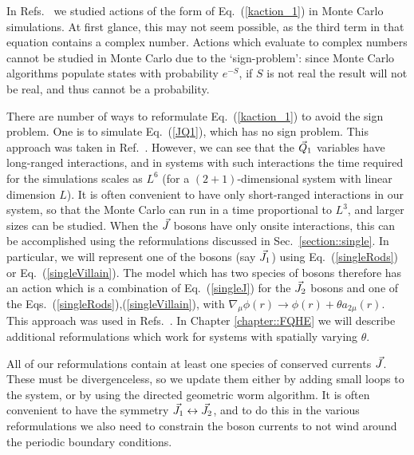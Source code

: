 In Refs.~\cite{Loopy,short_range3,Gen2Loops,FQHE} we studied actions of the form of Eq.~(\ref{kaction_1}) in Monte Carlo simulations. At first glance, this may not seem possible, as the third term in that equation contains a complex number. Actions which evaluate to complex numbers cannot be studied in Monte Carlo due to the `sign-problem': since Monte Carlo algorithms populate states with probability $e^{-S}$, if $S$ is not real the result will not be real, and thus cannot be a probability.

There are number of ways to reformulate Eq.~(\ref{kaction_1}) to avoid the sign problem. One is to simulate Eq.~(\ref{JQ1}), which has no sign problem. This approach was taken in Ref.~\cite{Gen2Loops}. However, we can see that the $\vec{Q}_1$ variables have long-ranged interactions, and in systems with such interactions the time required for the simulations scales as $L^6$ (for a $(2+1)$-dimensional system with linear dimension $L$). It is often convenient to have only short-ranged interactions in our system, so that the Monte Carlo can run in a time proportional to $L^3$, and larger sizes can be studied. 
When the $\vec{J}$ bosons have only onsite interactions, this can be accomplished using the reformulations discussed in Sec.~\ref{section::single}. In particular, we will represent one of the bosons (say $\vec{J}_1$) using Eq.~(\ref{singleRods}) or Eq.~(\ref{singleVillain}). The model which has two species of bosons therefore has an action which is a combination of Eq.~(\ref{singleJ}) for the $\vec{J}_2$ bosons and one of the Eqs.~(\ref{singleRods}),(\ref{singleVillain}), with $\nabla_\mu\phi(r)\rightarrow\phi(r)+\theta a_{2\mu}(r)$. This approach was used in Refs.~\cite{Loopy,short_range3}. 
In Chapter \ref{chapter::FQHE} we will describe additional reformulations which work for systems with spatially varying $\theta$. 

All of our reformulations contain at least one species of conserved currents $\vec{J}$. These must be divergenceless, so we update them either by adding small loops to the system, or by using the directed geometric worm algorithm\cite{Sorensen}. It is often convenient to have the symmetry $\vec{J}_1\leftrightarrow\vec{J}_2$, and to do this in the various reformulations we also need to constrain the boson currents to not wind around the periodic boundary conditions.

